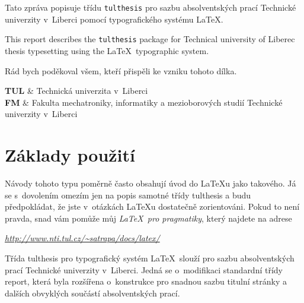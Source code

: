\documentclass[FM,DP]{tulthesis}
\newcommand{\argument}[1]{{\ttfamily\color{\tulcolor}#1}}
\newenvironment{myquote}{\begin{list}{}{\setlength\leftmargin\parindent}\item[]}{\end{list}}
\begin{document}

\begin{abstractCZ}
Tato zpráva popisuje třídu \texttt{tulthesis} pro sazbu absolventských prací
Technické univerzity v~Liberci pomocí typografického systému \LaTeX.
\end{abstractCZ}

\vspace{2cm}

\begin{abstractEN}
This report describes the \texttt{tulthesis} package for Technical university of
Liberec thesis typesetting using the \LaTeX\ typographic system.
\end{abstractEN}

\clearpage

\begin{acknowledgement}
Rád bych poděkoval všem, kteří přispěli ke vzniku tohoto dílka.
\end{acknowledgement}

\tableofcontents

\clearpage

\begin{abbrList}
\textbf{TUL} & Technická univerzita v~Liberci \\
\textbf{FM} & Fakulta mechatroniky, informatiky a mezioborových studií
Technické univerzity v~Liberci
\end{abbrList}

\chapter{Základy použití}

Návody tohoto typu poměrně často obsahují úvod do \LaTeX u jako takového. Já se
s~dovolením omezím jen na popis samotné třídy \argument{tulthesis} a budu
předpokládat, že jste v~otázkách \LaTeX u dostatečně zorientováni. Pokud
to není pravda, snad vám pomůže můj \emph{\LaTeX\ pro pragmatiky}, který
najdete na adrese

\begin{myquote}
\href{http://www.nti.tul.cz/~satrapa/docs/latex/}{\emph{http://www.nti.tul.cz/\textasciitilde satrapa/docs/latex/}}
\end{myquote}

Třída \argument{tulthesis} pro typografický systém \LaTeX\ slouží pro sazbu
absolventských prací Technické univerzity v~Liberci. Jedná se o~modifikaci
standardní třídy \argument{report}, která byla rozšířena o~konstrukce pro snadnou
sazbu titulní stránky a dalších obvyklých součástí absolventských prací.
\end{document}
